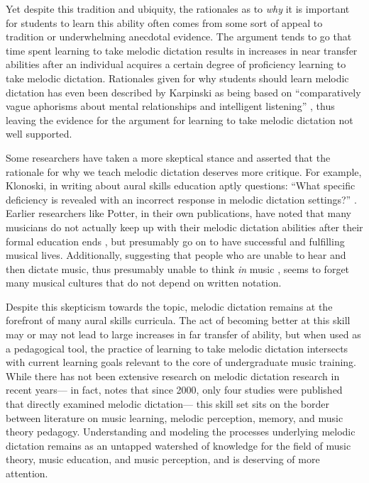 \documentclass[12pt,]{book}
\begin{document}
Yet despite this tradition and ubiquity, the rationales as to \emph{why} it is important for students to learn this ability often comes from some sort of appeal to tradition or underwhelming anecdotal evidence.
The argument tends to go that time spent learning to take melodic dictation results in increases in near transfer abilities after an individual acquires a certain degree of proficiency learning to take melodic dictation.
Rationales given for why students should learn melodic dictation has even been described by Karpinski as being based on ``comparatively vague aphorisms about mental relationships and intelligent listening'' \citep[p.~192]{karpinskiModelMusicPerception1990}, thus leaving the evidence for the argument for learning to take melodic dictation not well supported.

Some researchers have taken a more skeptical stance and asserted that the rationale for why we teach melodic dictation deserves more critique.
For example, Klonoski, in writing about aural skills education aptly questions: ``What specific deficiency is revealed with an incorrect response in melodic dictation settings?'' \citep{klonoskiImprovingDictationAuralSkills2006}.
Earlier researchers like Potter, in their own publications, have noted that many musicians do not actually keep up with their melodic dictation abilities after their formal education ends \citep{potterIdentifyingSucessfulDictation1990}, but presumably go on to have successful and fulfilling musical lives.
Additionally, suggesting that people who are unable to hear and then dictate music, thus presumably unable to think \emph{in} music \citep{karpinskiAuralSkillsAcquisition2000}, seems to forget many musical cultures that do not depend on written notation.

Despite this skepticism towards the topic, melodic dictation remains at the forefront of many aural skills curricula.
The act of becoming better at this skill may or may not lead to large increases in far transfer of ability, but when used as a pedagogical tool, the practice of learning to take melodic dictation intersects with current learning goals relevant to the core of undergraduate music training.
While there has not been extensive research on melodic dictation research in recent years--- in fact, \citet{paneyEffectDirectingAttention2016} notes that since 2000, only four studies were published that directly examined melodic dictation--- this skill set sits on the border between literature on music learning, melodic perception, memory, and music theory pedagogy.
Understanding and modeling the processes underlying melodic dictation remains as an untapped watershed of knowledge for the field of music theory, music education, and music perception, and is deserving of more attention.
\end{document}
